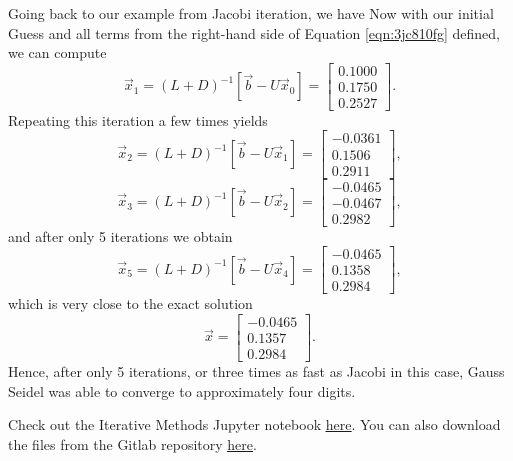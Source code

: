 Going back to our example from Jacobi iteration, we have
Now with our initial Guess and all terms from the right-hand side of Equation \ref{eqn:3jc810fg} defined, we can compute
\begin{equation}
	\vec{x}_{1} = (L + D)^{-1}\left[ \vec{b} - U\vec{x}_0 \right] = \begin{bmatrix}
	    0.1000 \\
	    0.1750 \\
			0.2527
	\end{bmatrix}.
\end{equation}
Repeating this iteration a few times yields
\begin{equation}
	\vec{x}_{2} = (L + D)^{-1}\left[ \vec{b} - U\vec{x}_1 \right] = \begin{bmatrix}
	    -0.0361 \\
	    0.1506 \\
			0.2911
	\end{bmatrix},
\end{equation}
\begin{equation}
	\vec{x}_{3} = (L + D)^{-1}\left[ \vec{b} - U\vec{x}_2 \right] = \begin{bmatrix}
	    -0.0465 \\
	    -0.0467 \\
			0.2982
	\end{bmatrix},
\end{equation}
and after only 5 iterations we obtain
\begin{equation}
		\vec{x}_{5} = (L + D)^{-1}\left[ \vec{b} - U\vec{x}_4 \right] = \begin{bmatrix}
	    -0.0465 \\
	    0.1358 \\
			0.2984
	\end{bmatrix},
\end{equation}
which is very close to the exact solution
\begin{equation}
	\vec{x} = \begin{bmatrix}
	    -0.0465 \\
	    0.1357 \\
			0.2984
	\end{bmatrix}.
\end{equation}
Hence, after only 5 iterations, or three times as fast as Jacobi in this case, Gauss Seidel was able to converge to approximately four digits.
\begin{jupyternote}
	Check out the Iterative Methods Jupyter notebook \href{\binderurl}{\underline{here}}. You can also download the files from the Gitlab repository \href{\repourl}{\underline{here}}.
\end{jupyternote}
